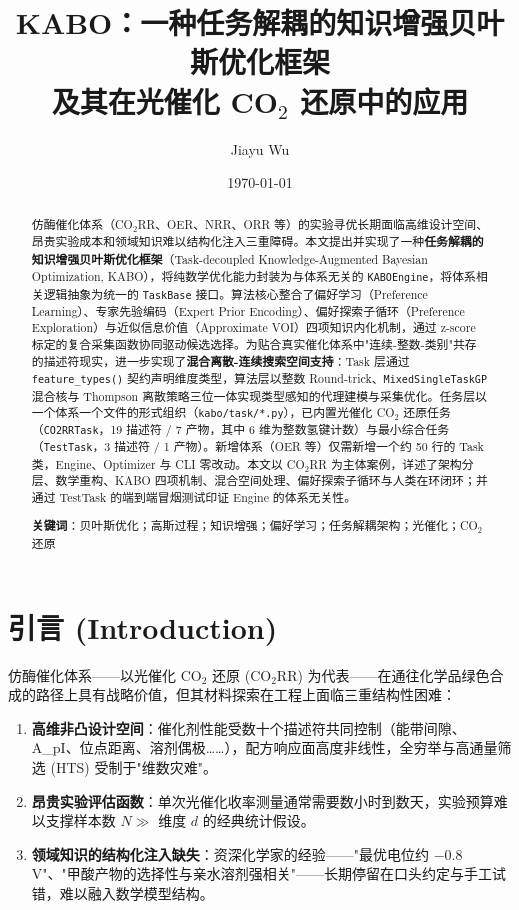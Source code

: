 \documentclass[12pt,a4paper]{article}
\title{\textbf{KABO：一种任务解耦的知识增强贝叶斯优化框架 \\ 及其在光催化 CO$_2$ 还原中的应用}}
\author{Jiayu Wu}
\date{\today}
\begin{document}
\maketitle

\begin{abstract}
仿酶催化体系（CO$_2$RR、OER、NRR、ORR 等）的实验寻优长期面临高维设计空间、昂贵实验成本和领域知识难以结构化注入三重障碍。本文提出并实现了一种\textbf{任务解耦的知识增强贝叶斯优化框架}（Task-decoupled Knowledge-Augmented Bayesian Optimization, KABO），将纯数学优化能力封装为与体系无关的 \texttt{KABOEngine}，将体系相关逻辑抽象为统一的 \texttt{TaskBase} 接口。算法核心整合了偏好学习（Preference Learning）、专家先验编码（Expert Prior Encoding）、偏好探索子循环（Preference Exploration）与近似信息价值（Approximate VOI）四项知识内化机制，通过 z-score 标定的复合采集函数协同驱动候选选择。为贴合真实催化体系中"连续-整数-类别"共存的描述符现实，进一步实现了\textbf{混合离散-连续搜索空间支持}：Task 层通过 \texttt{feature\_types()} 契约声明维度类型，算法层以整数 Round-trick、\texttt{MixedSingleTaskGP} 混合核与 Thompson 离散策略三位一体实现类型感知的代理建模与采集优化。任务层以一个体系一个文件的形式组织（\texttt{kabo/task/*.py}），已内置光催化 CO$_2$ 还原任务（\texttt{CO2RRTask}，19 描述符 / 7 产物，其中 6 维为整数氢键计数）与最小综合任务（\texttt{TestTask}，3 描述符 / 1 产物）。新增体系（OER 等）仅需新增一个约 50 行的 Task 类，Engine、Optimizer 与 CLI 零改动。本文以 CO$_2$RR 为主体案例，详述了架构分层、数学重构、KABO 四项机制、混合空间处理、偏好探索子循环与人类在环闭环；并通过 TestTask 的端到端冒烟测试印证 Engine 的体系无关性。

\textbf{关键词}：贝叶斯优化；高斯过程；知识增强；偏好学习；任务解耦架构；光催化；CO$_2$ 还原
\end{abstract}

\vspace{2em}
\tableofcontents
\newpage


\section{引言 (Introduction)}

仿酶催化体系——以光催化 CO$_2$ 还原 (CO$_2$RR) 为代表——在通往化学品绿色合成的路径上具有战略价值\cite{nature2025, jacs2024}，但其材料探索在工程上面临三重结构性困难：

\begin{enumerate}
    \item \textbf{高维非凸设计空间}：催化剂性能受数十个描述符共同控制（能带间隙、A\_pI、位点距离、溶剂偶极……），配方响应面高度非线性，全穷举与高通量筛选 (HTS)\cite{nature2025} 受制于"维数灾难"。
    \item \textbf{昂贵实验评估函数}：单次光催化收率测量通常需要数小时到数天，实验预算难以支撑样本数 $N \gg$ 维度 $d$ 的经典统计假设。
    \item \textbf{领域知识的结构化注入缺失}：资深化学家的经验——"最优电位约 $-0.8$ V"、"甲酸产物的选择性与亲水溶剂强相关"——长期停留在口头约定与手工试错，难以融入数学模型结构。
\end{enumerate}
\end{document}

